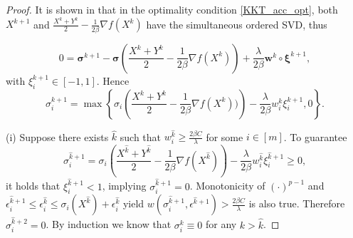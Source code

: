 \documentclass[twoside,11pt]{article}
\numberwithin{equation}{section}
\begin{document}
\begin{proof}
  It is shown in  \cite{opt_simu_svd_2017}   that  
  in the optimality condition \eqref {KKT_acc_opt},  both $X^{k+1} $ and $\frac{X^{k}+Y^k}{2} -\frac{1}{2\beta}\nabla f (X^{k}) $ have the simultaneous ordered SVD, thus 
 

  
 
 
  
  \begin{equation}\label{KKT_sgv}
    0 = \bm{\sigma}^{k+1}  - \bm{\sigma} \left(\frac{X^{k}+Y^k}{2} -\frac{1}{2\beta}\nabla f (X^{k})\right) + \frac{\lambda}{2\beta}{\bm w}^{k}\circ\bm{\xi}^{k+1},
  \end{equation}
  with ${\xi}_{i}^{k+1} \in[-1,1] $. Hence 
  \begin{equation}
    \sigma_i^{k+1}  = \max\left\{ \sigma_{i} \left(\frac{X^{k}+Y^k}{2} -\frac{1}{2\beta}\nabla f (X^{k}))\right) - \frac{\lambda}{2\beta}w_{i}^{k}{\xi}_{i}^{k+1} , 0 \right\} .
  \end{equation}
 

(i)  Suppose there exists $\hat k$ such that  $w_{i}^{\hat k} \ge \frac{2\beta C}{\lambda} $ for some $i\in[m]$. 
To guarantee 
      \begin{equation}
       \sigma_i^{\hat k+1}  =  \sigma_{i} \left(\frac{X^{\hat k}+Y^{\hat k}}{2} -\frac{1}{2\beta}\nabla f (X^{\hat k})\right) - \frac{\lambda}{2\beta}w_{i}^{\hat k}\xi_i^{\hat k+1} \ge 0,  
      \end{equation}
    it holds that  $\xi_i^{\hat k+1} < 1$, implying $\sigma_i^{\hat k+1} = 0$.  
 Monotonicity of $ (\cdot)^{p-1} $ and $\epsilon_{i}^{\hat{k}+1} \le \epsilon_{i}^{\hat{k}} \le \sigma_{i}(X^{\hat{k}}) + \epsilon_{i}^{\hat{k}} $ yield 
 $w(\sigma_{i}^{\hat{k}+1}, \epsilon^{\hat{k}+1}) >  \frac{2\beta C}{\lambda}$ is also true.  
 Therefore $\sigma_i^{\hat k+2} = 0$. 
      By induction we know that $\sigma_i^{k} \equiv 0 $ for any $k>\hat{k} $.


\end{proof}
\end{document}
